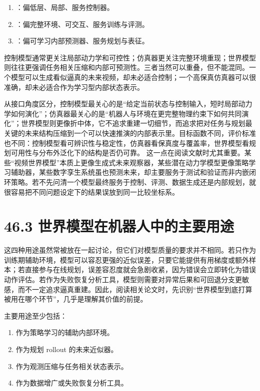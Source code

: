 \begin{enumerate}
\item \texttt{}：偏低层、局部、服务控制器。
\item \texttt{}：偏完整环境、可交互、服务训练与评测。
\item \texttt{}：偏可学习内部预测器、服务规划与表征。
\end{enumerate}

控制模型通常更关注局部动力学和可控性；仿真器更关注完整环境重现；世界模型则往往更强调任务相关压缩和内部可预测性。三者当然可以重叠，但不能混同。一个模型可以生成看似逼真的未来视频，却未必适合控制；一个高保真仿真器可以很准确，却未必适合作为学习型内部状态表示。

从接口角度区分，控制模型最关心的是“给定当前状态与控制输入，短时局部动力学如何演化”；仿真器最关心的是“机器人与环境在更完整物理约束下如何共同演化”；世界模型则更像折中体，它不追求重建一切细节，而追求把对任务与规划最关键的未来结构压缩到一个可以快速推演的内部表示里。目标函数不同，评价标准也不同：控制模型看可辨识性与稳定性，仿真器看保真度与覆盖率，世界模型看规划可用性与分布外泛化下的结构是否仍可靠。 这一点在阅读文献时尤其重要。某些“视频世界模型”本质上更像生成式未来观察器，某些潜在动力学模型更像策略学习辅助器，某些数字孪生系统虽也预测未来，却主要服务于测试和验证而非内嵌闭环策略。若不先问清一个模型最终服务于控制、评测、数据生成还是内部规划，就很容易把不同问题设定下的结果误放到同一比较坐标系。

\section*{46.3 世界模型在机器人中的主要用途}


这四种用途虽然常被放在一起讨论，但它们对模型质量的要求并不相同。若只作为训练期辅助环境，模型可以容忍更强的近似误差，只要它能提供有用梯度或额外样本；若直接参与在线规划，误差容忍度就会急剧收紧，因为错误会立即转化为错误动作评估。若作为失败恢复分析工具，模型则需要对异常后果和可回退分支更敏感，而不一定追求逼真重建。因此，阅读相关论文时，先识别“世界模型到底打算被用在哪个环节”，几乎是理解其价值的前提。

主要用途至少包括：

\begin{enumerate}
\item 作为策略学习的辅助内部环境。
\item 作为规划 rollout 的未来近似器。
\item 作为观测压缩与任务相关状态表示。
\item 作为数据增广或失败恢复分析工具。
\end{enumerate}

